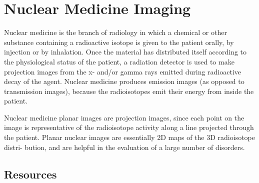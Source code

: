 \chapter{Nuclear Medicine Imaging}

Nuclear medicine is the branch of radiology in which a chemical or
other substance containing a radioactive isotope is given to the
patient orally, by injection or by inhalation. Once the material has
distributed itself according to the physiological status of the
patient, a radiation detector is used to make projection images from
the x- and/or gamma rays emitted during radioactive decay of the
agent. Nuclear medicine produces emission images (as opposed to
transmission images), because the radioisotopes emit their energy from
inside the patient. \cite{bushberg2011essential}

Nuclear medicine planar images are projection images, since each point
on the image is representative of the radioisotope activity along a
line projected through the patient. Planar nuclear images are
essentially 2D maps of the 3D radioisotope distri- bution, and are
helpful in the evaluation of a large number of
disorders. \cite{bushberg2011essential}


\section{Resources}


